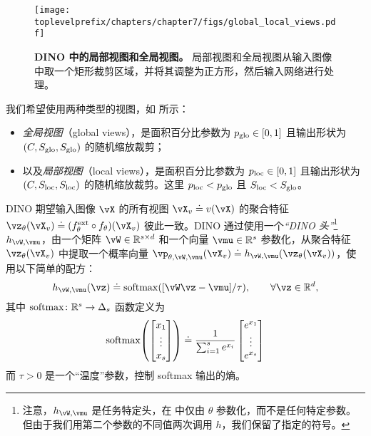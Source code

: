 \documentclass[../../book-main_zh.tex]{subfiles}
\begin{document}
\begin{figure}
    \centering 
    \texttt{[image: \\toplevelprefix/chapters/chapter7/figs/global\_local\_views.pdf]}
    \caption{\textbf{DINO 中的局部视图和全局视图。} 局部视图和全局视图从输入图像中取一个矩形裁剪区域，并将其调整为正方形，然后输入网络进行处理。}
    \label{fig:dino_local_global_views}
\end{figure}

我们希望使用两种类型的视图，如  所示：
\begin{itemize}
    \item \textit{全局视图}（global views），是面积百分比参数为 \(p_{\mathrm{glo}} \in [0, 1]\) 且输出形状为 \((C, S_{\mathrm{glo}}, S_{\mathrm{glo}})\) 的随机缩放裁剪；
    \item 以及\textit{局部视图}（local views），是面积百分比参数为 \(p_{\mathrm{loc}} \in [0, 1]\) 且输出形状为 \((C, S_{\mathrm{loc}}, S_{\mathrm{loc}})\) 的随机缩放裁剪。这里 \(p_{\mathrm{loc}} < p_{\mathrm{glo}}\) 且 \(S_{\mathrm{loc}} < S_{\mathrm{glo}}\)。
\end{itemize}

DINO 期望输入图像 \(\vX\) 的所有视图 \(\vX_{v} \doteq v(\vX)\) 的聚合特征 \(\vz_{\theta}(\vX_{v}) \doteq (f_{\theta}^{\ext} \circ f_{\theta})(\vX_{v})\) 彼此一致。DINO 通过使用一个\textit{“DINO 头”}\footnote{注意，\(h_{\vW, \vmu}\) 是任务特定头，在  中仅由 \(\theta\) 参数化，而不是任何特定参数。但由于我们用第二个参数的不同值两次调用 \(h\)，我们保留了指定的符号。} \(h_{\vW, \vmu}\)，由一个矩阵 \(\vW \in \R^{s \times d}\) 和一个向量 \(\vmu \in \R^{s}\) 参数化，从聚合特征 \(\vz_{\theta}(\vX_{v})\) 中提取一个概率向量 \(\vp_{\theta, \vW, \vmu}(\vX_{v}) \doteq h_{\vW, \vmu}(\vz_{\theta}(\vX_{v}))\)，使用以下简单的配方：
\begin{equation}
    h_{\vW, \vmu}(\vz) \doteq \softmax([\vW\vz - \vmu]/\tau), \qquad \forall \vz \in \R^{d},
\end{equation}
其中 \(\operatorname{\mathrm{softmax}} \colon \mathbb{R}^{s} \to \Delta_{s}\) 函数定义为
\begin{equation}
    \softmax\rp{\mat{x_{1} \\ \vdots \\ x_{s}}} \doteq \frac{1}{\sum_{i = 1}^{s}e^{x_{i}}}\mat{e^{x_{1}} \\ \vdots \\ e^{x_{s}}}
\end{equation}
而 \(\tau > 0\) 是一个“温度”参数，控制 softmax 输出的熵。
\end{document}
